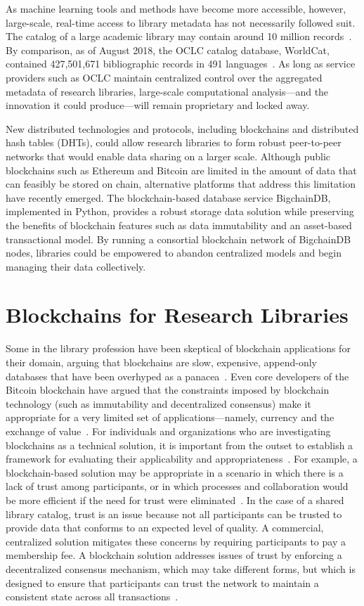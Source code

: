 As machine learning tools and methods have become more accessible,
however, large-scale, real-time access to library metadata has not
necessarily followed suit. The catalog of a large academic library may
contain around 10 million records~\cite{yul18}. By comparison, as of August
2018, the OCLC catalog database, WorldCat, contained 427,501,671
bibliographic records in 491 languages~\cite{oclc18}. As long as service
providers such as OCLC maintain centralized control over the aggregated
metadata of research libraries, large-scale computational analysis---and the
innovation it could produce---will remain proprietary and locked away.

﻿New distributed technologies and protocols, including blockchains and
distributed hash tables (DHTs), could allow research libraries to form
robust peer-to-peer networks that would enable data sharing on a larger
scale. Although public blockchains such as Ethereum and Bitcoin are limited
in the amount of data that can feasibly be stored on chain, alternative
platforms that address this limitation have recently emerged. The
blockchain-based database service BigchainDB, implemented in Python,
provides a robust storage data solution while preserving the benefits of
blockchain features such as data immutability and an asset-based
transactional model. By running a consortial blockchain network of
BigchainDB nodes, libraries could be empowered to abandon centralized models
and begin managing their data collectively.

\section{Blockchains for Research Libraries}
﻿Some in the library profession have been skeptical of blockchain
applications for their domain, arguing that blockchains are slow, expensive,
append-only databases that have been overhyped as a panacea~\cite{sjsu18}.
Even core developers of the Bitcoin blockchain have argued that the
constraints imposed by blockchain technology (such as immutability and
decentralized consensus) make it appropriate for a very limited set of
applications---namely, currency and the exchange of value~\cite{jSong18}.
For individuals and organizations who are investigating blockchains as a
technical solution, it is important from the outset to establish a framework
for evaluating their applicability and appropriateness~\cite{bS28}. For
example, a blockchain-based solution may be appropriate in a scenario in
which there is a lack of trust among participants, or in which processes and
collaboration would be more efficient if the need for trust were
eliminated~\cite{bS28}. In the case of a shared library catalog, trust is an
issue because not all participants can be trusted to provide data that
conforms to an expected level of quality. A commercial, centralized solution
mitigates these concerns by requiring participants to pay a membership fee.
A blockchain solution addresses issues of trust by enforcing a decentralized
consensus mechanism, which may take different forms, but which is designed
to ensure that participants can trust the network to maintain a consistent
state across all transactions~\cite{buchman2018latest}. 

